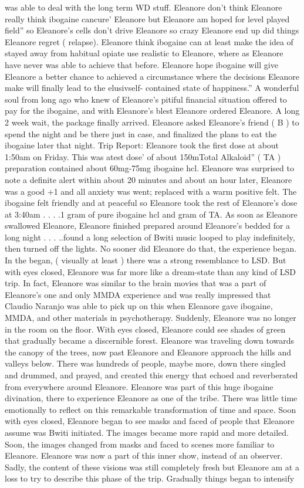 \documentclass[12pt]{book}
\begin{document}
was able to deal with the long term WD stuff. Eleanore don't think Eleanore really think ibogaine cancure' Eleanore but Eleanore am hoped for level played field'' so Eleanore's cells don't drive Eleanore so crazy Eleanore end up did things Eleanore regret ( relapse). Eleanore think ibogaine can at least make the idea of stayed away from habitual opiate use realistic to Eleanore, where as Eleanore have never was able to achieve that before. Eleanore hope ibogaine will give Eleanore a better chance to achieved a circumstance where the decisions Eleanore make will finally lead to the elusivself- contained state of happiness.'' A wonderful soul from long ago who knew of Eleanore's pitiful financial situation offered to pay for the ibogaine, and with Eleanore's blest Eleanore ordered Eleanore. A long 2  week wait, the package finally arrived. Eleanore asked Eleanore's friend ( B ) to spend the night and be there just in case, and finalized the plans to eat the ibogaine later that night. Trip Report: Eleanore took the first dose at about 1:50am on Friday. This was atest dose' of about 150mTotal Alkaloid'' ( TA ) preparation contained about 60mg-75mg ibogaine hcl. Eleanore was surprised to note a definite alert within about 20 minutes and about an hour later, Eleanore was a good +1  and all anxiety was went; replaced with a warm positive felt. The ibogaine felt friendly and at peaceful so Eleanore took the rest of Eleanore's dose at 3:40am . . . .1 gram of pure ibogaine hcl and  gram of TA. As soon as Eleanore swallowed Eleanore, Eleanore finished prepared around Eleanore's bedded for a long night . . . ..found a long selection of Bwiti music looped to play indefinitely, then turned off the lights. No sooner did Eleanore do that, the experience began. In the began, ( visually at least ) there was a strong resemblance to LSD. But with eyes closed, Eleanore was far more like a dream-state than any kind of LSD trip. In fact, Eleanore was similar to the brain movies that was a part of Eleanore's one and only MMDA experience and was really impressed that Claudio Naranjo was able to pick up on this when Eleanore gave ibogaine, MMDA, and other materials in psychotherapy. Suddenly, Eleanore was no longer in the room on the floor. With eyes closed, Eleanore could see shades of green that gradually became a discernible forest. Eleanore was traveling down towards the canopy of the trees, now past Eleanore and Eleanore approach the hills and valleys below. There was hundreds of people, maybe more, down there singled and drummed, and prayed, and created this energy that echoed and reverberated from everywhere around Eleanore. Eleanore was part of this huge ibogaine divination, there to experience Eleanore as one of the tribe. There was little time emotionally to reflect on this remarkable transformation of time and space. Soon with eyes closed, Eleanore began to see masks and faced of people that Eleanore assume was Bwiti initiated. The images became more rapid and more detailed. Soon, the images changed from masks and faced to scenes more familiar to Eleanore. Eleanore was now a part of this inner show, instead of an observer. Sadly, the content of these visions was still completely fresh but Eleanore am at a loss to try to describe this phase of the trip. Gradually things began to intensify 
\end{document}
